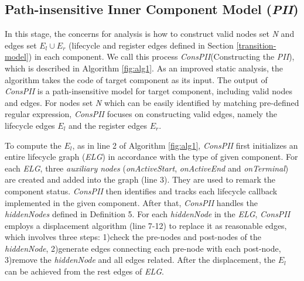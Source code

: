 
\subsection{Path-insensitive Inner Component Model (\textit{PII})}
In this stage, the concerns for analysis is how to construct valid nodes set \textit{N} and edges set $E_{l} \cup E_{r}$ (lifecycle and register edges defined in Section \ref{transition-model}) in each component. We call this process \textit{ConsPII}(Constructing the \textit{PII}), which is described in Algorithm \ref{fig:alg1}. As an improved static analysis, the algorithm takes the code of target component as its input. The output of \textit{ConsPII} is a path-insensitive model for target component, including valid nodes and edges. For nodes set \textit{N} which can be easily identified by matching pre-defined regular expression, \textit{ConsPII} focuses on constructing valid edges, namely the lifecycle edges $E_{l}$ and the register edges $E_{r}$.  

To compute the $E_{l}$, as in line 2 of Algorithm \ref{fig:alg1}, \textit{ConsPII} first initializes an entire lifecycle graph (\textit{ELG}) in accordance with the type of given component. For each \textit{ELG}, three \textit{auxiliary nodes} (\textit{onActiveStart}, \textit{onActiveEnd} and \textit{onTerminal}) are created and added into the graph (line 3). They are used to remark the component status. \textit{ConsPII} then identifies and tracks each lifecycle callback implemented in the given component. After that, \textit{ConsPII} handles the \textit{hiddenNodes} defined in Definition 5. For each \textit{hiddenNode} in the \textit{ELG}, \textit{ConsPII} employs a displacement algorithm (line 7-12) to replace it as reasonable edges, which involves three steps: 1)check the pre-nodes and post-nodes of the \textit{hiddenNode}, 2)generate edges connecting each pre-node with each post-node, 3)remove the \textit{hiddenNode} and all edges related. After the displacement, the $E_{l}$ can be achieved from the rest edges of \textit{ELG}. 

